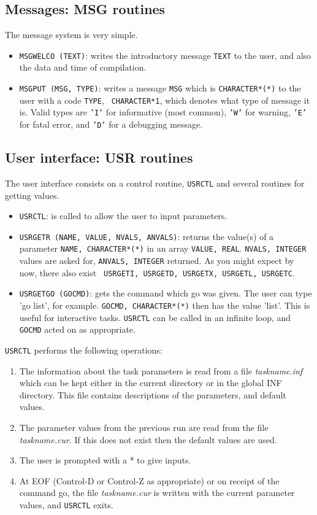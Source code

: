 \subsection{Messages: MSG routines}

The message system is very simple. 
\begin{itemize}
\item {\tt MSGWELCO (TEXT)}: writes the introductory message {\tt TEXT} to
the user, and also the data and time of compilation.
\item {\tt MSGPUT (MSG, TYPE)}: writes a message {\tt MSG} which is
{\tt CHARACTER*(*)}
to the user with a code {\tt TYPE}, {\tt
CHARACTER*1}, which denotes what type
of message it is. Valid types are {\tt 'I'} for informative (most common),
{\tt 'W'} for warning, {\tt 'E'} for fatal error, and {\tt 'D'} for a
debugging message.
\end{itemize}

\subsection{User interface: USR routines}

The user interface consists on a control routine, {\tt USRCTL} and
several routines for getting values.
\begin{itemize}
\item {\tt USRCTL}: is called to allow the user to input parameters. 
\item {\tt USRGETR (NAME, VALUE, NVALS, ANVALS)}: returns the value(s) of
a parameter {\tt NAME, CHARACTER*(*)} in an array {\tt VALUE,
REAL}. {\tt NVALS, INTEGER} values are asked for, {\tt ANVALS, 
INTEGER} returned. As you might expect by now, there also exist {\tt
USRGETI, USRGETD, USRGETX, USRGETL, USRGETC}.
\item {\tt USRGETGO (GOCMD)}: gets the command which go was given. The user
can type 'go list', for example. {\tt GOCMD, CHARACTER*(*)} then has
the value 'list'. This is useful for interactive tasks. {\tt USRCTL} can
be called in an infinite loop, and {\tt GOCMD} acted on as
appropriate.
\end{itemize}

{\tt USRCTL} performs the following operations:
\begin{enumerate}
\item The information about the task parameters is read from a file
{\em taskname.inf} which can be kept either in the current directory or in the
global INF directory. This file contains descriptions of the parameters,
and default values.
\item The parameter values from the previous run are read from the file
{\em taskname.cur}. If this does not exist then the default values are used.
\item The user is prompted with a * to give inputs.
\item At EOF (Control-D or Control-Z as appropriate) or on receipt of the
command go, the file {\em taskname.cur} is written with the current parameter
values, and {\tt USRCTL} exits.
\end{enumerate}

